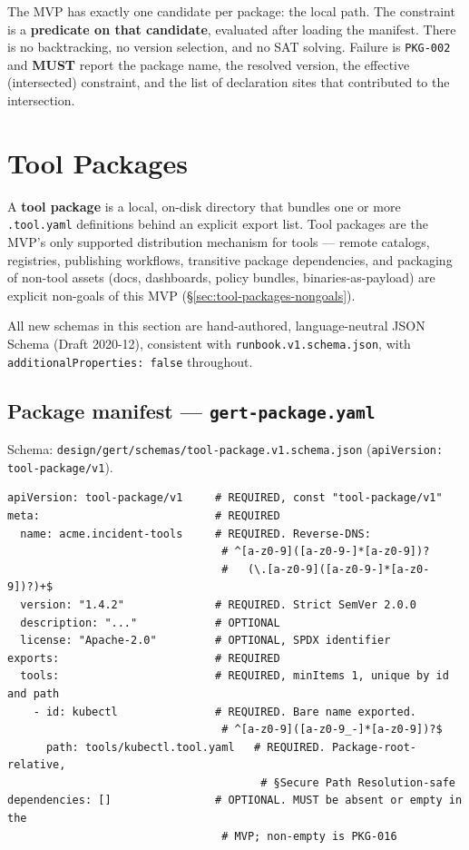 The MVP has exactly one candidate per package: the local path. The
constraint is a \textbf{predicate on that candidate}, evaluated after loading
the manifest. There is no backtracking, no version selection, and no SAT
solving. Failure is \texttt{PKG-002} and \textbf{MUST} report the package
name, the resolved version, the effective (intersected) constraint, and the
list of declaration sites that contributed to the intersection.

\section{Tool Packages}
\label{sec:tool-packages}

A \textbf{tool package} is a local, on-disk directory that bundles one or
more \texttt{.tool.yaml} definitions behind an explicit export list. Tool
packages are the MVP's only supported distribution mechanism for tools ---
remote catalogs, registries, publishing workflows, transitive package
dependencies, and packaging of non-tool assets (docs, dashboards, policy
bundles, binaries-as-payload) are explicit non-goals of this MVP
(\S\ref{sec:tool-packages-nongoals}).

All new schemas in this section are hand-authored, language-neutral JSON
Schema (Draft 2020-12), consistent with \texttt{runbook.v1.schema.json},
with \texttt{additionalProperties: false} throughout.

\subsection{Package manifest --- \texttt{gert-package.yaml}}
\label{sec:tool-package-manifest}

Schema: \texttt{design/gert/schemas/tool-package.v1.schema.json}
(\texttt{apiVersion: tool-package/v1}).

\begin{verbatim}
apiVersion: tool-package/v1     # REQUIRED, const "tool-package/v1"
meta:                           # REQUIRED
  name: acme.incident-tools     # REQUIRED. Reverse-DNS:
                                 # ^[a-z0-9]([a-z0-9-]*[a-z0-9])?
                                 #   (\.[a-z0-9]([a-z0-9-]*[a-z0-9])?)+$
  version: "1.4.2"              # REQUIRED. Strict SemVer 2.0.0
  description: "..."            # OPTIONAL
  license: "Apache-2.0"         # OPTIONAL, SPDX identifier
exports:                        # REQUIRED
  tools:                        # REQUIRED, minItems 1, unique by id and path
    - id: kubectl               # REQUIRED. Bare name exported.
                                 # ^[a-z0-9]([a-z0-9_-]*[a-z0-9])?$
      path: tools/kubectl.tool.yaml   # REQUIRED. Package-root-relative,
                                       # §Secure Path Resolution-safe
dependencies: []                # OPTIONAL. MUST be absent or empty in the
                                 # MVP; non-empty is PKG-016
\end{verbatim}

